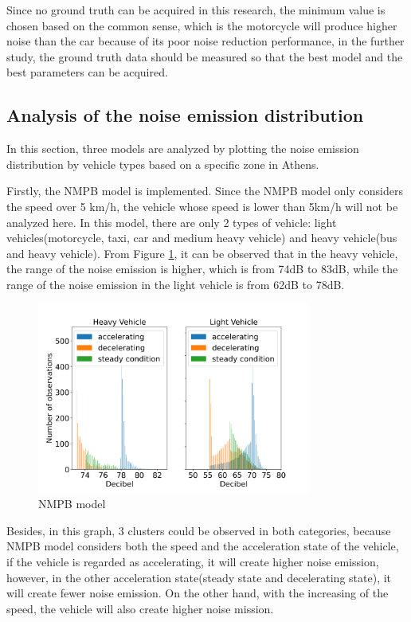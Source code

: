 \documentclass{article}
\begin{document}
\noindent Since no ground truth can be acquired in this research, the minimum value is chosen based on the common sense, which is the motorcycle will produce higher noise than the car because of its poor noise reduction performance, in the further study, the ground truth data should be measured so that the best model and the best parameters can be acquired.
\subsection{Analysis of the noise emission distribution}
\noindent In this section, three models are analyzed by plotting the noise emission distribution by vehicle types based on a specific zone in Athens.

\noindent Firstly, the NMPB model is implemented. Since the NMPB model only considers the speed over 5 km/h, the vehicle whose speed is lower than 5km/h will not be analyzed here. In this model, there are only 2 types of vehicle: light vehicles(motorcycle, taxi, car and medium heavy vehicle) and heavy vehicle(bus and heavy vehicle). From Figure \ref{NMPB model}, it can be observed that in the heavy vehicle, the range of the noise emission is higher, which is from 74dB to 83dB, while the range of the noise emission in the light vehicle is from 62dB to 78dB.

\begin{figure}[h]
    \begin{center}
        \includegraphics[width=0.8\textwidth]{NMPB model.png}
        \caption{NMPB model}
        \label{NMPB model}
    \end{center}
\end{figure}

\noindent Besides, in this graph, 3 clusters could be observed in both categories, because NMPB model considers both the speed and the acceleration state of the vehicle, if the vehicle is regarded as accelerating, it will create higher noise emission, however, in the other acceleration state(steady state and decelerating state), it will create fewer noise emission. On the other hand, with the increasing of the speed, the vehicle will also create higher noise mission.
\end{document}
